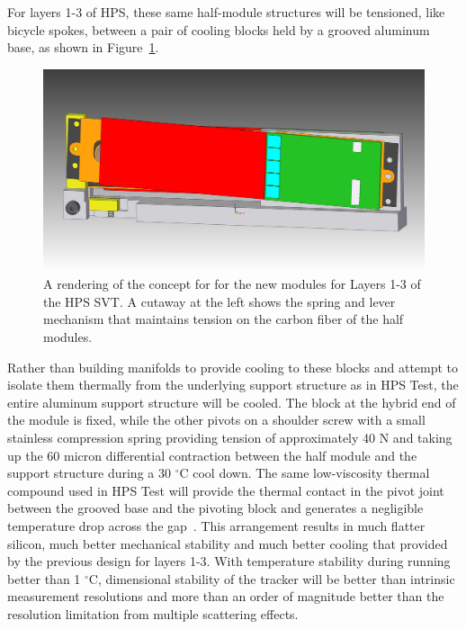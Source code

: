 For layers 1-3 of HPS, these same half-module structures will be tensioned, like bicycle spokes, between a pair of cooling blocks held by a grooved aluminum base, as shown in Figure~\ref{fig:newmodule_L1-3}. 
\begin{figure}[ht]
    \includegraphics[width=\textwidth]{svt/figures/10dec3.jpg}
\caption{\small{A rendering of the concept for for the new modules for Layers 1-3 of the HPS SVT.  A cutaway at the left shows the spring and lever mechanism that maintains tension on the carbon fiber of the half modules.} }
\label{fig:newmodule_L1-3}
\end{figure}
Rather than building manifolds to provide cooling to these blocks and attempt to isolate them thermally from the underlying support structure as in HPS Test, the entire aluminum support structure will be cooled.  The block at the hybrid end of the module is fixed, while the other pivots on a shoulder screw with a small stainless compression spring providing tension of approximately 40 N and taking up the 60 micron differential contraction between the half module and the support structure during a 30 $^\circ$C cool down. The same low-viscosity thermal compound used in HPS Test will provide the thermal contact in the pivot joint between the grooved base and the pivoting block and generates a negligible temperature drop across the gap~\cite{ref:dow_5121}. This arrangement results in much flatter silicon, much better mechanical stability and much better cooling that provided by the previous design for layers 1-3. With temperature stability during running better than 1 $^\circ$C, dimensional stability of the tracker will be better than intrinsic measurement resolutions and more than an order of magnitude better than the resolution limitation from multiple scattering effects.

